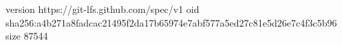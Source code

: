 version https://git-lfs.github.com/spec/v1
oid sha256:a4b271a8fadcac21495f2da17b65974e7abf577a5ed27c81e5d26e7c4f3c5b96
size 87544

